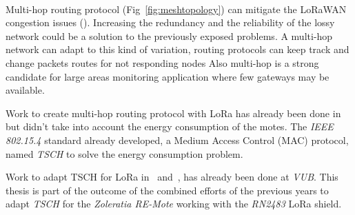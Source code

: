 


\paragraph{}

Multi-hop routing protocol (Fig~\ref{fig:meshtopology}) can mitigate
the LoRaWAN congestion issues (\cite{8115756}).
Increasing the redundancy and the reliability of the lossy network could be a
solution to the previously exposed problems.
A multi-hop network can adapt to this kind of variation, routing protocols can
keep track and change packets routes for not responding nodes
Also multi-hop is a strong candidate for large areas monitoring application
where few gateways may be available.

Work to create multi-hop routing protocol with LoRa has already been
done in~\cite{8115756} but didn't take into account the energy consumption of
the motes.
The \emph{IEEE 802.15.4} standard already developed, a Medium Access Control (MAC)
protocol, named \emph{TSCH} to solve the energy consumption problem.

Work to adapt TSCH for LoRa in~\cite{8847137} and~\cite{njomgang_2018}, has
already been done at \emph{VUB}.
This thesis is part of the outcome of the combined efforts of the previous
years to adapt \emph{TSCH} for the \emph{Zoleratia RE-Mote} working with the
\emph{RN2483} LoRa shield.
